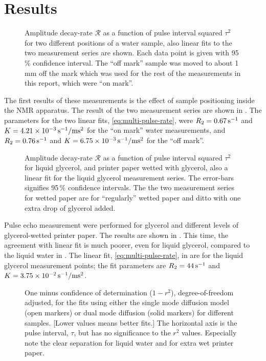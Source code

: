 \documentclass[11pt,a4paper, twocolumn,
swedish, english %
]{article}
\begin{document}
\section{Results}

\begin{figure}
\centering

\caption{Amplitude decay-rate $\mathcal{R}$ as a function of pulse
  interval squared $\tau^2$ for two different positions of a water
  sample, also linear fits to the two measurement series are
  shown. Each data point is given with 95\,\% confidence
  interval. The ``off mark'' sample was moved to about 1\,mm off the
  mark which was used for the rest of the measurements in this report,
  which were ``on mark''. } 
\label{fig:water-pos}
\end{figure}

The first results of these measurements is the effect of sample
positioning inside the NMR apparatus. The result of the two
measurement series are shown in .
The parameters for the two linear fits, \eqref{eq:multi-pulse-rate},
were $R_2=\unit[0.67]{s^{-1}}$ and  
$K=\unit[4.21\times10^{-3}]{s^{-1}/ms^2}$ for the ``on mark'' water
measurements, and $R_2=\unit[0.76]{s^{-1}}$ and
$K=\unit[6.75\times10^{-3}]{s^{-1}/ms^2}$ for the ``off mark''.


\begin{figure}
\centering

\caption{Amplitude decay-rate $\mathcal{R}$ as a function of pulse
  interval squared $\tau^2$ for liquid glycerol, and printer paper
  wetted with glycerol, also a linear fit for the liquid glycerol
  measurement series. The error-bars signifies 95\,\% confidence
  intervals. The the two measurement series for wetted paper are for
  ``regularly'' wetted paper and ditto with one extra drop of glycerol
  added. }
\label{fig:glyc}
\end{figure}

Pulse echo measurement were performed for glycerol and
different levels of glycerol-wetted printer paper. The results are
shown in . This time, the agreement with linear fit
is much poorer, even for liquid glycerol, compared to the liquid water
in . The linear fit,
\eqref{eq:multi-pulse-rate}, in  are for the liquid
glycerol measurement points; the fit parameters are
$R_2=\unit[44]{s^{-1}}$ and
$K=\unit[3.75\times10^{-2}]{s^{-1}/ms^2}$.


\begin{figure*}
\centering

\caption{One minus confidence of determination ($1-r^2$),
  degree-of-freedom adjusted, for the fits using either the single
  mode diffusion model (open markers) or dual mode diffusion (solid
  markers) for different samples. [Lower values means better fits.]
  The horizontal axis is the pulse interval, $\tau$, but has no
  significance to the $r^2$ values. Especially note the clear
  separation for liquid water and for extra wet printer paper.
} 
\label{fig:good-fit}
\end{figure*}
\end{document}
